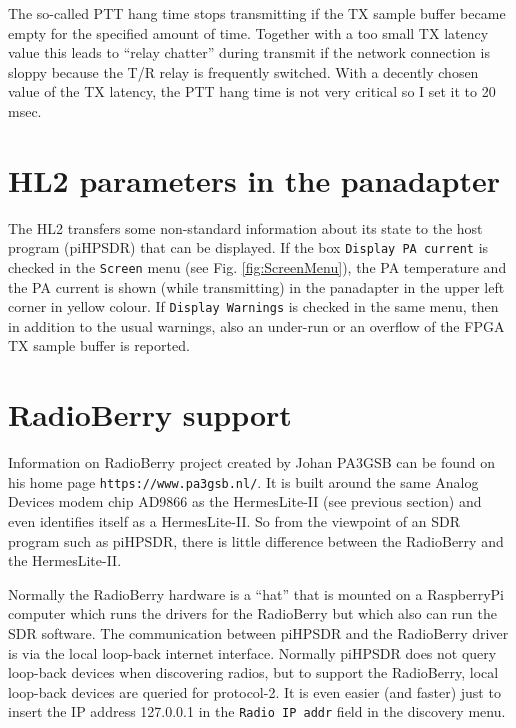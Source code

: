 \documentclass[12pt]{book}
\def\rett#1{\texttt{\color{red}#1}}
\def\bltt#1{\texttt{\color{blue}#1}}
\def\pH{pi\-HPSDR\xspace}
\begin{document}
The so-called PTT hang time stops transmitting if the TX sample buffer became empty for the specified
amount of time. Together with a too small TX latency value this leads to ``relay chatter'' during transmit
if the network connection is sloppy because the T/R relay is frequently switched. With a decently chosen
value of the TX latency, the PTT hang time is not very critical so I set it to 20 msec.

\section{HL2 parameters in the panadapter}

The HL2 transfers some non-standard information about its state to the host program (\pH) that can be displayed.
If the box \rett{Display PA current} is checked in the \bltt{Screen} menu (see Fig. \ref{fig:ScreenMenu}),
the PA temperature and the PA current is shown (while transmitting) in the panadapter in the upper
left corner in yellow colour. If \rett{Display Warnings} is checked in the same menu, then in addition to
the usual warnings, also an under-run or an overflow of the FPGA TX sample buffer is reported.

\section{RadioBerry support}
\label{sec:radioberry}

Information on RadioBerry project created by Johan PA3GSB can be found on his home page
\texttt{https://www.pa3gsb.nl/}. It is built around the same Analog Devices modem chip AD9866
as the HermesLite-II (see previous section) and even identifies itself as a HermesLite-II. So from
the viewpoint of an SDR program such as \pH, there is little difference between the RadioBerry and
the HermesLite-II.

Normally the RadioBerry hardware is a ``hat'' that is mounted on a RaspberryPi computer which runs
the drivers for the RadioBerry but which also can run the SDR software. The communication between
 \pH and the RadioBerry driver is via the local loop-back internet
interface. Normally \pH does not query loop-back devices when discovering radios, but to support
the RadioBerry, local loop-back devices are queried for protocol-2. It is even easier (and faster)
just to insert the IP address 127.0.0.1 in the \rett{Radio IP addr} field in the discovery menu.
\end{document}
